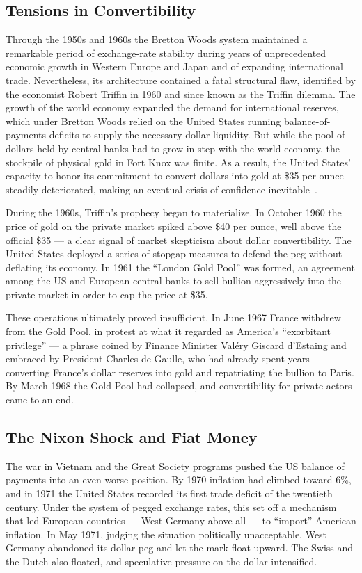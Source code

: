 \subsection{Tensions in Convertibility}
Through the 1950s and 1960s the Bretton Woods system maintained a remarkable period of exchange-rate stability during years of unprecedented economic growth in Western Europe and Japan and of expanding international trade. Nevertheless, its architecture contained a fatal structural flaw, identified by the economist Robert Triffin in 1960 and since known as the Triffin dilemma. The growth of the world economy expanded the demand for international reserves, which under Bretton Woods relied on the United States running balance-of-payments deficits to supply the necessary dollar liquidity. But while the pool of dollars held by central banks had to grow in step with the world economy, the stockpile of physical gold in Fort Knox was finite. As a result, the United States' capacity to honor its commitment to convert dollars into gold at \$35 per ounce steadily deteriorated, making an eventual crisis of confidence inevitable~\cite{Triffin1960,Eichengreen1996}.

During the 1960s, Triffin's prophecy began to materialize. In October 1960 the price of gold on the private market spiked above \$40 per ounce, well above the official \$35 --- a clear signal of market skepticism about dollar convertibility. The United States deployed a series of stopgap measures to defend the peg without deflating its economy. In 1961 the ``London Gold Pool'' was formed, an agreement among the US and European central banks to sell bullion aggressively into the private market in order to cap the price at \$35.

These operations ultimately proved insufficient. In June 1967 France withdrew from the Gold Pool, in protest at what it regarded as America's ``exorbitant privilege'' --- a phrase coined by Finance Minister Val{\'e}ry Giscard d'Estaing and embraced by President Charles de Gaulle, who had already spent years converting France's dollar reserves into gold and repatriating the bullion to Paris. By March 1968 the Gold Pool had collapsed, and convertibility for private actors came to an end.
\subsection{The Nixon Shock and Fiat Money}
The war in Vietnam and the Great Society programs pushed the US balance of payments into an even worse position. By 1970 inflation had climbed toward 6\%, and in 1971 the United States recorded its first trade deficit of the twentieth century. Under the system of pegged exchange rates, this set off a mechanism that led European countries --- West Germany above all --- to ``import'' American inflation. In May 1971, judging the situation politically unacceptable, West Germany abandoned its dollar peg and let the mark float upward. The Swiss and the Dutch also floated, and speculative pressure on the dollar intensified.

